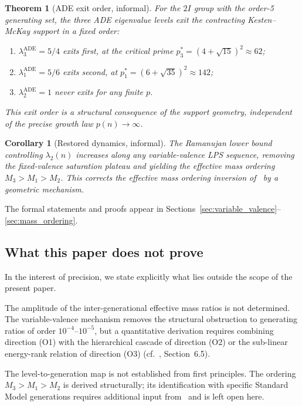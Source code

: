 \documentclass[11pt]{article}
\newtheorem*{theorem*}{Theorem}
\newtheorem*{corollary*}{Corollary}
\newcommand{\lADE}[1]{\lambda_{#1}^{\mathrm{ADE}}}
\begin{document}
      \begin{theorem*}[ADE exit order, informal]
  For the $2I$ group with the order-5 generating set, the three ADE eigenvalue
  levels exit the contracting Kesten--McKay support in a fixed order:
  \begin{enumerate}
    \item $\lADE{3} = 5/4$ exits first, at the critical prime
    $p_3^* = (4 + \sqrt{15})^2 \approx 62$;
    \item $\lADE{1} = 5/6$ exits second, at $p_1^* = (6 + \sqrt{35})^2
    \approx 142$;
    \item $\lADE{2} = 1$ never exits for any finite $p$.
  \end{enumerate}
  This exit order is a structural consequence of the support geometry,
  independent of the precise growth law $p(n) \to \infty$.
      \end{theorem*}

      \begin{corollary*}[Restored dynamics, informal]
  The Ramanujan lower bound controlling $\lambda_2(n)$ increases along any
  variable-valence LPS sequence, removing the fixed-valence saturation plateau
  and yielding the effective mass ordering $M_3 > M_1 > M_2$.
  This corrects the effective mass ordering inversion of~\cite{Beau2026a5}
  by a geometric mechanism.
      \end{corollary*}

      The formal statements and proofs appear in
      Sections~\ref{sec:variable_valence}--\ref{sec:mass_ordering}.

    \subsection{What this paper does not prove}
      \label{subsec:non_results}

      In the interest of precision, we state explicitly what lies outside the scope
      of the present paper.

      The amplitude of the inter-generational effective mass ratios is not
      determined.
      The variable-valence mechanism removes the structural obstruction to generating
      ratios of order $10^{-4}$--$10^{-5}$, but a quantitative derivation requires
      combining direction (O1) with the hierarchical cascade of direction (O2) or
      the sub-linear energy-rank relation of direction (O3)
      (cf.~\cite{Beau2026a5}, Section~6.5).

      The level-to-generation map is not established from first principles.
      The ordering $M_3 > M_1 > M_2$ is derived structurally; its identification
      with specific Standard Model generations requires additional input
      from~\cite{Beau2026a4} and is left open here.
\end{document}
